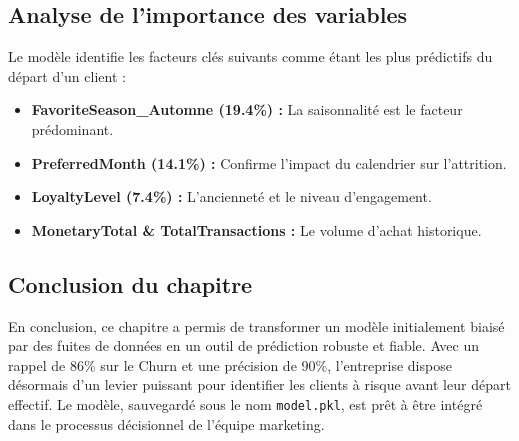 \subsection{Analyse de l'importance des variables}
Le modèle identifie les facteurs clés suivants comme étant les plus prédictifs du départ d'un client :
\begin{itemize}
	\item \textbf{FavoriteSeason\_Automne (19.4\%) :} La saisonnalité est le facteur prédominant.
	\item \textbf{PreferredMonth (14.1\%) :} Confirme l'impact du calendrier sur l'attrition.
	\item \textbf{LoyaltyLevel (7.4\%) :} L'ancienneté et le niveau d'engagement.
	\item \textbf{MonetaryTotal \& TotalTransactions :} Le volume d'achat historique.
\end{itemize}

\subsection{Conclusion du chapitre}
En conclusion, ce chapitre a permis de transformer un modèle initialement biaisé par des fuites de données en un outil de prédiction robuste et fiable. Avec un rappel de 86\% sur le Churn et une précision de 90\%, l'entreprise dispose désormais d'un levier puissant pour identifier les clients à risque avant leur départ effectif. Le modèle, sauvegardé sous le nom \texttt{model.pkl}, est prêt à être intégré dans le processus décisionnel de l'équipe marketing.